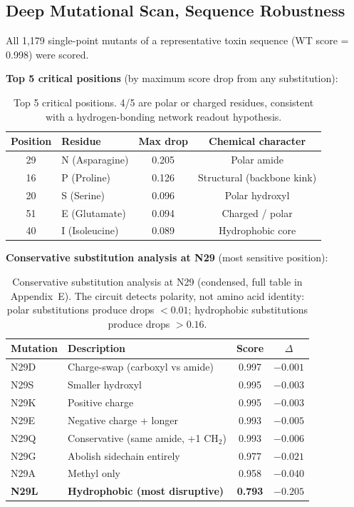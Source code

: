 \documentclass[11pt,a4paper]{article}
\begin{document}
\subsection{Deep Mutational Scan,  Sequence Robustness}

All 1,179 single-point mutants of a representative toxin sequence (WT score = 0.998) were scored.

\textbf{Top 5 critical positions} (by maximum score drop from any substitution):

\begin{table}[H]
\centering
\begin{tabular}{clcc}
\toprule
\textbf{Position} & \textbf{Residue} & \textbf{Max drop} & \textbf{Chemical character} \\
\midrule
29 & N (Asparagine) & 0.205 & Polar amide \\
16 & P (Proline) & 0.126 & Structural (backbone kink) \\
20 & S (Serine) & 0.096 & Polar hydroxyl \\
51 & E (Glutamate) & 0.094 & Charged / polar \\
40 & I (Isoleucine) & 0.089 & Hydrophobic core \\
\bottomrule
\end{tabular}
\caption{Top 5 critical positions. 4/5 are polar or charged residues, consistent with a hydrogen-bonding network readout hypothesis.}
\end{table}

\textbf{Conservative substitution analysis at N29} (most sensitive position):

\begin{table}[H]
\centering
\begin{tabular}{llcc}
\toprule
\textbf{Mutation} & \textbf{Description} & \textbf{Score} & \textbf{$\Delta$} \\
\midrule
N29D & Charge-swap (carboxyl vs amide) & 0.997 & $-0.001$ \\
N29S & Smaller hydroxyl & 0.995 & $-0.003$ \\
N29K & Positive charge & 0.995 & $-0.003$ \\
N29E & Negative charge + longer & 0.993 & $-0.005$ \\
N29Q & Conservative (same amide, +1 CH$_2$) & 0.993 & $-0.006$ \\
\midrule
N29G & Abolish sidechain entirely & 0.977 & $-0.021$ \\
N29A & Methyl only & 0.958 & $-0.040$ \\
\midrule
\textbf{N29L} & \textbf{Hydrophobic (most disruptive)} & \textbf{0.793} & $\mathbf{-0.205}$ \\
\bottomrule
\end{tabular}
\caption{Conservative substitution analysis at N29 (condensed, full table in Appendix~E). The circuit detects polarity, not amino acid identity: polar substitutions produce drops $< 0.01$; hydrophobic substitutions produce drops $>0.16$.}
\end{table}
\end{document}
